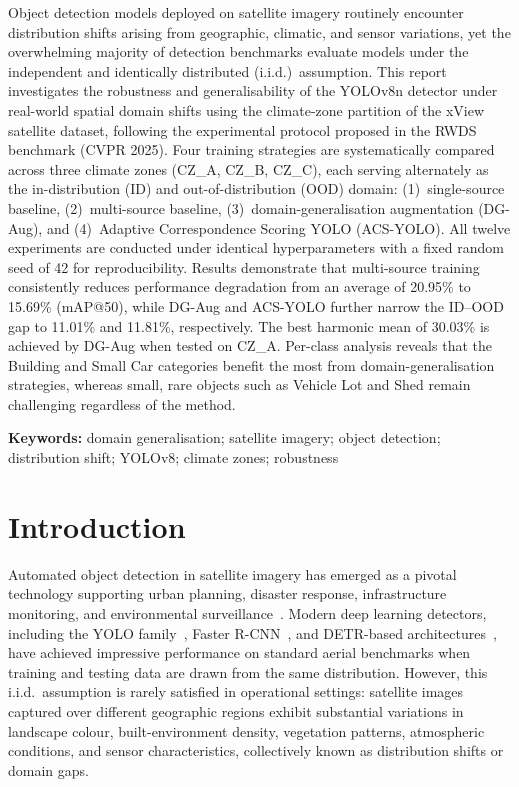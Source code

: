 \documentclass[12pt,a4paper]{article}
\begin{document}
Object detection models deployed on satellite imagery routinely encounter distribution shifts arising from geographic, climatic, and sensor variations, yet the overwhelming majority of detection benchmarks evaluate models under the independent and identically distributed (i.i.d.)\ assumption. This report investigates the robustness and generalisability of the YOLOv8n detector under real-world spatial domain shifts using the climate-zone partition of the xView satellite dataset, following the experimental protocol proposed in the RWDS benchmark (CVPR 2025). Four training strategies are systematically compared across three climate zones (CZ\_A, CZ\_B, CZ\_C), each serving alternately as the in-distribution (ID) and out-of-distribution (OOD) domain: (1)~single-source baseline, (2)~multi-source baseline, (3)~domain-generalisation augmentation (DG-Aug), and (4)~Adaptive Correspondence Scoring YOLO (ACS-YOLO). All twelve experiments are conducted under identical hyperparameters with a fixed random seed of 42 for reproducibility. Results demonstrate that multi-source training consistently reduces performance degradation from an average of 20.95\% to 15.69\% (mAP@50), while DG-Aug and ACS-YOLO further narrow the ID--OOD gap to 11.01\% and 11.81\%, respectively. The best harmonic mean of 30.03\% is achieved by DG-Aug when tested on CZ\_A. Per-class analysis reveals that the Building and Small Car categories benefit the most from domain-generalisation strategies, whereas small, rare objects such as Vehicle Lot and Shed remain challenging regardless of the method.

\vspace{6pt}
\noindent\textbf{Keywords:} domain generalisation; satellite imagery; object detection; distribution shift; YOLOv8; climate zones; robustness

\newpage

\section{Introduction}

Automated object detection in satellite imagery has emerged as a pivotal technology supporting urban planning, disaster response, infrastructure monitoring, and environmental surveillance~\cite{alemadi2025rwds,shermeyer2020xview}. Modern deep learning detectors, including the YOLO family~\cite{redmon2016yolo,jocher2023yolov8}, Faster R-CNN~\cite{ren2015fasterrcnn}, and DETR-based architectures~\cite{carion2020detr,zhang2022dino}, have achieved impressive performance on standard aerial benchmarks when training and testing data are drawn from the same distribution. However, this i.i.d.\ assumption is rarely satisfied in operational settings: satellite images captured over different geographic regions exhibit substantial variations in landscape colour, built-environment density, vegetation patterns, atmospheric conditions, and sensor characteristics, collectively known as distribution shifts or domain gaps.
\end{document}
